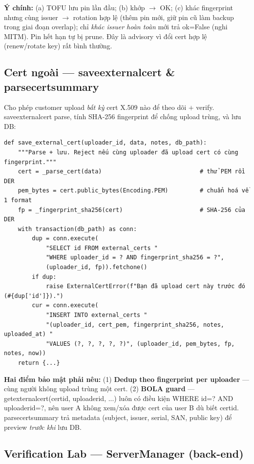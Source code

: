 \documentclass[12pt,a4paper]{article}
\newcommand{\code}[1]{{\ttfamily\small\def\_{\textunderscore\discretionary{}{}{}}#1}}
\begin{document}
\textbf{Ý chính:} (a) TOFU lưu pin lần đầu; (b) khớp $\to$ OK; (c) khác fingerprint
nhưng cùng issuer $\to$ rotation hợp lệ (thêm pin mới, giữ pin cũ làm backup trong
giai đoạn overlap); chỉ \emph{khác issuer hoàn toàn} mới trả \code{ok=False} (nghi
MITM). Pin hết hạn tự bị prune. Đây là advisory vì đổi cert hợp lệ (renew/rotate
key) rất bình thường.

\subsection{Cert ngoài --- \code{save\_external\_cert} \& \code{parse\_cert\_summary}}

Cho phép customer upload \emph{bất kỳ} cert X.509 nào để theo dõi $+$ verify.
\code{save\_external\_cert} parse, tính SHA-256 fingerprint để chống upload trùng,
và lưu DB:

\begin{Verbatim}
def save_external_cert(uploader_id, data, notes, db_path):
    """Parse + lưu. Reject nếu cùng uploader đã upload cert có cùng fingerprint."""
    cert = _parse_cert(data)                            # thử PEM rồi DER
    pem_bytes = cert.public_bytes(Encoding.PEM)         # chuẩn hoá về 1 format
    fp = _fingerprint_sha256(cert)                      # SHA-256 của DER
    with transaction(db_path) as conn:
        dup = conn.execute(
            "SELECT id FROM external_certs "
            "WHERE uploader_id = ? AND fingerprint_sha256 = ?",
            (uploader_id, fp)).fetchone()
        if dup:
            raise ExternalCertError(f"Bạn đã upload cert này trước đó (#{dup['id']}).")
        cur = conn.execute(
            "INSERT INTO external_certs "
            "(uploader_id, cert_pem, fingerprint_sha256, notes, uploaded_at) "
            "VALUES (?, ?, ?, ?, ?)", (uploader_id, pem_bytes, fp, notes, now))
    return {...}
\end{Verbatim}

\textbf{Hai điểm bảo mật phải nêu:} (1) \textbf{Dedup theo fingerprint per
uploader} --- cùng người không upload trùng một cert. (2) \textbf{BOLA guard} ---
\code{get\_external\_cert(cert\_id, uploader\_id, ...)} luôn có điều kiện
\code{WHERE id=? AND uploader\_id=?}, nên user A không xem/xóa được cert của user
B dù biết \code{cert\_id}. \code{parse\_cert\_summary} trả metadata (subject,
issuer, serial, SAN, public key) để preview \emph{trước khi} lưu DB.

\subsection{Verification Lab --- \code{ServerManager} (back-end)}
\end{document}
